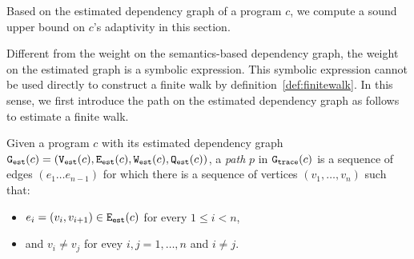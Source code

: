 Based on
the estimated dependency graph of a program $c$,
%
we compute a sound upper bound on $c$'s adaptivity in this section.
%

Different from the weight on the semantics-based dependency graph, the weight on the estimated graph is a symbolic expression. This symbolic expression cannot be used directly to construct a finite walk
by definition~\ref{def:finitewalk}. In this sense,
we first introduce the path on the estimated dependency graph as follows to estimate a finite walk.
\begin{defn}[Path]
 \label{def:prog_finitewalk}
 Given a program $c$ with its estimated dependency graph 
 $\mathtt{{G_{est}}}({c}) = (\mathtt{{V_{est}}}(c), \mathtt{{E_{est}}}(c), \mathtt{{W_{est}}}(c), \mathtt{{Q_{est}}}(c))$, 
 a \emph{path} $p$ in $\mathtt{{G_{trace}}}({c})$ is
 a sequence of edges $(e_1 \ldots e_{n - 1})$ 
 for which there is a sequence of vertices 
 $(v_1, \ldots, v_{n})$ 
 such that:
 \begin{itemize}
 \item $e_i = (v_{i},v_{i + 1}) \in \mathtt{{E_{est}}}(c)$ for every $1 \leq i < n$,
 \item and $v_i \neq v_j$ for evey $i, j = 1, \ldots, n$ and $i \neq j$.
 \end{itemize}
 \end{defn}

